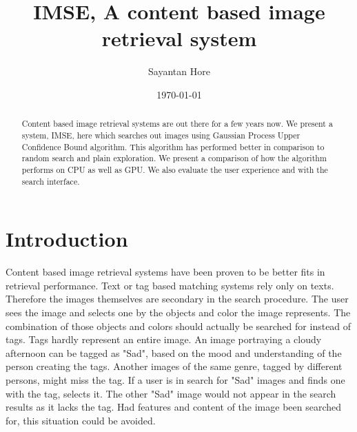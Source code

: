 \documentclass[english]{tktltiki}
\begin{document}
\onehalfspacing

\title{IMSE, A content based image retrieval system}
\author{Sayantan Hore}
\date{\today}

\maketitle



\begin{abstract}

Content based image retrieval systems are out there for a few years now. We present a system, IMSE, here which searches out images using Gaussian Process Upper Confidence Bound algorithm. This algorithm has performed better in comparison to random search and plain exploration. We present a comparison of how the algorithm performs on CPU as well as GPU. We also evaluate the user experience and with the search interface.

\end{abstract}

\mytableofcontents




\section{Introduction}


Content based image retrieval systems have been proven to be better fits in retrieval performance. Text or tag based matching systems rely only on texts. Therefore the images themselves are secondary in the search procedure. The user sees the image and selects one by the objects and color the image represents. The combination of those objects and colors should actually be searched for instead of tags. Tags hardly represent an entire image. An image portraying a cloudy afternoon can be tagged as "Sad", based on the mood and understanding of the person creating the tags. Another images of the same genre, tagged by different persons, might miss the tag. If a user is in search for "Sad" images and finds one with the tag, selects it. The other "Sad" image would not appear in the search results as it lacks the tag. Had features and content of the image been searched for, this situation could be avoided.
\end{document}
